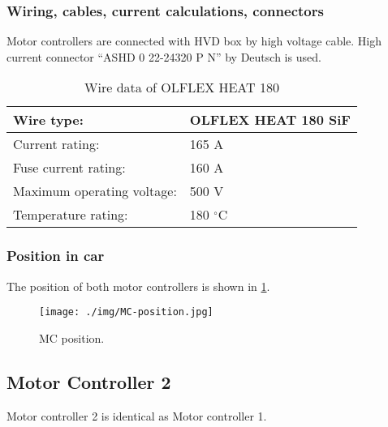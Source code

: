\subsubsection{Wiring, cables, current calculations, connectors}

Motor controllers are connected with HVD box by high voltage cable. High current connector “ASHD 0 22-24320 P N” by Deutsch is used. 

\begin{table}[H]
	\centering
	\caption{Wire data of OLFLEX HEAT 180}
	\begin{tabu}{|X|X|}\hline
		Wire type: & OLFLEX HEAT 180 SiF  \\\hline
		Current rating: & 165 A \\\hline
		Fuse current rating: & 160 A \\\hline
		Maximum operating voltage: & 500 V \\\hline
		Temperature rating: & 180 $^\circ$C \\\hline
	\end{tabu}%
	\label{tab:MC:wire}%
\end{table}%

\subsubsection{Position in car}

The position of both motor controllers is shown in \ref{fig:MC:position}.

\begin{figure}[H]
	\centering
	\texttt{[image: ./img/MC-position.jpg]}
	\caption{MC position.}
	\label{fig:MC:position}
\end{figure}
\subsection{Motor Controller 2}
Motor controller 2 is identical as Motor controller 1.




